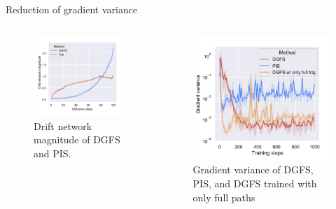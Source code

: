 \documentclass[aspectratio=169,xcolor=dvipsnames]{beamer}
\begin{document}
\begin{frame}[t]{Reduction of gradient variance}
\begin{columns}[t]
\begin{column}{0.33\textwidth}
\begin{figure}
    \includegraphics[width=\textwidth]{figures/drift.png}
    \caption{Drift network magnitude of DGFS and PIS.}
\end{figure}
\end{column}
\begin{column}{0.33\textwidth}
\begin{figure}
    \centering
    \includegraphics[width=\textwidth]{figures/grad_variance_2.png}
    \caption{Gradient variance of
DGFS, PIS, and DGFS trained
with only full paths}
\end{figure}
\end{column}
\end{columns}

\end{frame}
\end{document}
